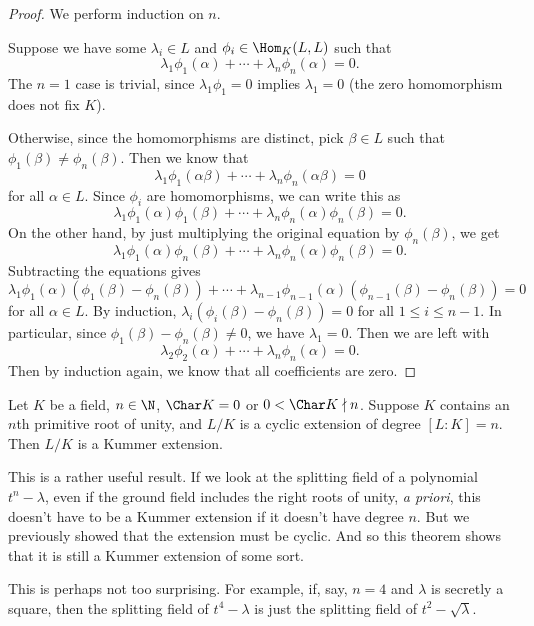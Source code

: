\documentclass[a4paper]{article}
\begin{document}
\begin{proof}
  We perform induction on $n$.

  Suppose we have some $\lambda_i \in L$ and $\phi_i \in \Hom_K(L, L)$ such that
  \[
    \lambda_1 \phi_1(\alpha) + \cdots + \lambda_n \phi_n(\alpha) = 0.
  \]
  The $n = 1$ case is trivial, since $\lambda_1 \phi_1 = 0$ implies $\lambda_1 = 0$ (the zero homomorphism does not fix $K$).

  Otherwise, since the homomorphisms are distinct, pick $\beta \in L$ such that $\phi_1(\beta) \not= \phi_n(\beta)$. Then we know that
  \[
    \lambda_1 \phi_1(\alpha\beta) + \cdots + \lambda_n \phi_n(\alpha\beta) = 0
  \]
  for all $\alpha \in L$. Since $\phi_i$ are homomorphisms, we can write this as
  \[
    \lambda_1 \phi_1(\alpha)\phi_1(\beta) + \cdots + \lambda_n \phi_n(\alpha)\phi_n(\beta) = 0.
  \]
  On the other hand, by just multiplying the original equation by $\phi_n(\beta)$, we get
  \[
    \lambda_1 \phi_1(\alpha)\phi_n(\beta) + \cdots + \lambda_n \phi_n(\alpha)\phi_n(\beta) = 0.
  \]
  Subtracting the equations gives
  \[
    \lambda_1 \phi_1(\alpha) (\phi_1(\beta) - \phi_n(\beta)) + \cdots + \lambda_{n - 1}\phi_{n - 1}(\alpha) (\phi_{n - 1}(\beta) - \phi_n(\beta)) = 0
  \]
  for all $\alpha \in L$. By induction, $\lambda_i(\phi_i(\beta) - \phi_n(\beta)) = 0$ for all $1 \leq i \leq n - 1$. In particular, since $\phi_1(\beta) - \phi_n(\beta) \not= 0$, we have $\lambda_1 = 0$. Then we are left with
  \[
    \lambda_2 \phi_2(\alpha) + \cdots + \lambda_n \phi_n(\alpha) = 0.
  \]
  Then by induction again, we know that all coefficients are zero.
\end{proof}

\begin{thm}
  Let $K$ be a field, $n \in \N$, $\Char K = 0$ or $0 < \Char K \nmid n$. Suppose $K$ contains an $n$th primitive root of unity, and $L/K$ is a cyclic extension of degree $[L:K] = n$. Then $L/K$ is a Kummer extension.
\end{thm}

This is a rather useful result. If we look at the splitting field of a polynomial $t^n - \lambda$, even if the ground field includes the right roots of unity, \emph{a priori}, this doesn't have to be a Kummer extension if it doesn't have degree $n$. But we previously showed that the extension must be cyclic. And so this theorem shows that it is still a Kummer extension of some sort.

This is perhaps not too surprising. For example, if, say, $n = 4$ and $\lambda$ is secretly a square, then the splitting field of $t^4 - \lambda$ is just the splitting field of $t^2 - \sqrt{\lambda}$.
\end{document}
